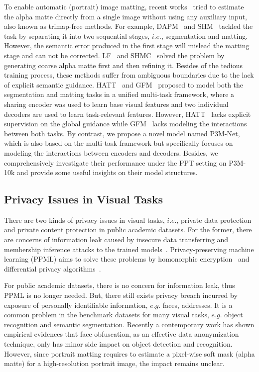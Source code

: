 \documentclass[sigconf]{acmart}
\begin{document}
To enable automatic (portrait) image matting, recent works~\cite{shm,lf,hatt,gfm,aim} tried to estimate the alpha matte directly from a single image without using any auxiliary input, also known as trimap-free methods. For example, DAPM~\cite{dapm} and SHM~\cite{shm} tackled the task by separating it into two sequential stages, $i.e.$, segmentation and matting. However, the semantic error produced in the first stage will mislead the matting stage and can not be corrected. LF~\cite{lf} and SHMC~\cite{shmc} solved the problem by generating coarse alpha matte first and then refining it. Besides of the tedious training process, these methods suffer from ambiguous boundaries due to the lack of explicit semantic guidance. HATT~\cite{hatt} and GFM~\cite{gfm} proposed to model both the segmentation and matting tasks in a unified multi-task framework, where a sharing encoder was used to learn base visual features and two individual decoders are used to learn task-relevant features. However, HATT~\cite{hatt} lacks explicit supervision on the global guidance while GFM~\cite{gfm} lacks modeling the interactions between both tasks. By contrast, we propose a novel model named P3M-Net, which is also based on the multi-task framework but specifically focuses on modeling the interactions between encoders and decoders. Besides, we comprehensively investigate their performance under the PPT setting on P3M-10k and provide some useful insights on their model structures. 

\subsection{Privacy Issues in Visual Tasks}
There are two kinds of privacy issues in visual tasks, $i.e.$, private data protection and private content protection in public academic datasets. For the former, there are concerns of information leak caused by insecure data transferring and membership inference attacks to the trained models~\cite{shokri2017membership,hisamoto2020membership,fredrikson2015model,carlini2019secret}. Privacy-preserving machine learning (PPML) aims to solve these problems by homonorphic encryption~\cite{erkin2009privacy,yonetani2017privacy} and differential privacy algorithms~\cite{NEURIPS2020_fc4ddc15,abadi2016deep}.

For public academic datasets, there is no concern for information leak, thus PPML is no longer needed. But, there still exists privacy breach incurred by exposure of personally identifiable information, $e.g.$ faces, addresses. It is a common problem in the benchmark datasets for many visual tasks, $e.g.$ object recognition and semantic segmentation. Recently a contemporary work \cite{yang2021study} has shown empirical evidences that face obfuscation, as an effective data anonymization technique, only has minor side impact on object detection and recognition. However, since portrait matting requires to estimate a pixel-wise soft mask (alpha matte) for a high-resolution portrait image, the impact  remains unclear.
\end{document}

